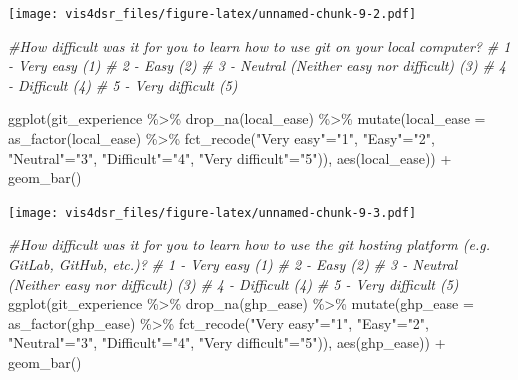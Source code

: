 \documentclass[
]{krantz}
\makeatletter
\newenvironment{Shaded}{\begin{snugshade}}{\end{snugshade}}
\newcommand{\AttributeTok}[1]{\textcolor[rgb]{0.61,0.61,0.61}{#1}}
\newcommand{\CommentTok}[1]{\textcolor[rgb]{0.37,0.37,0.37}{\textit{#1}}}
\newcommand{\FunctionTok}[1]{\textcolor[rgb]{0,0,0}{#1}}
\newcommand{\NormalTok}[1]{#1}
\newcommand{\OtherTok}[1]{\textcolor[rgb]{0.37,0.37,0.37}{#1}}
\newcommand{\SpecialCharTok}[1]{\textcolor[rgb]{0,0,0}{#1}}
\newcommand{\StringTok}[1]{\textcolor[rgb]{0.5,0.5,0.5}{#1}}
\newenvironment{kframe}{%
\medskip{}
\setlength{\fboxsep}{.8em}
 \def\at@end@of@kframe{}%
 \ifinner\ifhmode%
  \def\at@end@of@kframe{\end{minipage}}%
  \begin{minipage}{\columnwidth}%
 \fi\fi%
 \def\FrameCommand##1{\hskip\@totalleftmargin \hskip-\fboxsep
 \colorbox{shadecolor}{##1}\hskip-\fboxsep
     \hskip-\linewidth \hskip-\@totalleftmargin \hskip\columnwidth}%
 \MakeFramed {\advance\hsize-\width
   \@totalleftmargin\z@ \linewidth\hsize
   \@setminipage}}%
 {\par\unskip\endMakeFramed%
 \at@end@of@kframe}
\renewenvironment{Shaded}{\begin{kframe}}{\end{kframe}}
\makeatother
\begin{document}
\texttt{[image: vis4dsr\_files/figure-latex/unnamed-chunk-9-2.pdf]}

\begin{Shaded}
\begin{Highlighting}[]
\CommentTok{\#How difficult was it for you to learn how to use git on your local computer?}
\CommentTok{\# 1 {-} Very easy (1)}
\CommentTok{\# 2 {-} Easy (2)}
\CommentTok{\# 3 {-} Neutral (Neither easy nor difficult) (3)}
\CommentTok{\# 4 {-} Difficult (4)}
\CommentTok{\# 5 {-} Very difficult (5)}

\FunctionTok{ggplot}\NormalTok{(git\_experience }\SpecialCharTok{\%\textgreater{}\%} 
         \FunctionTok{drop\_na}\NormalTok{(local\_ease) }\SpecialCharTok{\%\textgreater{}\%}
         \FunctionTok{mutate}\NormalTok{(}\AttributeTok{local\_ease =} \FunctionTok{as\_factor}\NormalTok{(local\_ease) }\SpecialCharTok{\%\textgreater{}\%} 
             \FunctionTok{fct\_recode}\NormalTok{(}\StringTok{"Very easy"}\OtherTok{=}\StringTok{"1"}\NormalTok{, }
                        \StringTok{"Easy"}\OtherTok{=}\StringTok{"2"}\NormalTok{, }\StringTok{"Neutral"}\OtherTok{=}\StringTok{"3"}\NormalTok{, }
                        \StringTok{"Difficult"}\OtherTok{=}\StringTok{"4"}\NormalTok{, }\StringTok{"Very difficult"}\OtherTok{=}\StringTok{"5"}\NormalTok{)), }
       \FunctionTok{aes}\NormalTok{(local\_ease)) }\SpecialCharTok{+}
  \FunctionTok{geom\_bar}\NormalTok{()}
\end{Highlighting}
\end{Shaded}

\texttt{[image: vis4dsr\_files/figure-latex/unnamed-chunk-9-3.pdf]}

\begin{Shaded}
\begin{Highlighting}[]
\CommentTok{\#How difficult was it for you to learn how to use the git hosting platform (e.g. GitLab, GitHub, etc.)?}
\CommentTok{\# 1 {-} Very easy (1)}
\CommentTok{\# 2 {-} Easy (2)}
\CommentTok{\# 3 {-} Neutral (Neither easy nor difficult) (3)}
\CommentTok{\# 4 {-} Difficult (4)}
\CommentTok{\# 5 {-} Very difficult (5)}
\FunctionTok{ggplot}\NormalTok{(git\_experience }\SpecialCharTok{\%\textgreater{}\%} 
         \FunctionTok{drop\_na}\NormalTok{(ghp\_ease) }\SpecialCharTok{\%\textgreater{}\%}
         \FunctionTok{mutate}\NormalTok{(}\AttributeTok{ghp\_ease =} \FunctionTok{as\_factor}\NormalTok{(ghp\_ease) }\SpecialCharTok{\%\textgreater{}\%} 
             \FunctionTok{fct\_recode}\NormalTok{(}\StringTok{"Very easy"}\OtherTok{=}\StringTok{"1"}\NormalTok{, }
                        \StringTok{"Easy"}\OtherTok{=}\StringTok{"2"}\NormalTok{, }\StringTok{"Neutral"}\OtherTok{=}\StringTok{"3"}\NormalTok{, }
                        \StringTok{"Difficult"}\OtherTok{=}\StringTok{"4"}\NormalTok{, }\StringTok{"Very difficult"}\OtherTok{=}\StringTok{"5"}\NormalTok{)), }
       \FunctionTok{aes}\NormalTok{(ghp\_ease)) }\SpecialCharTok{+}
  \FunctionTok{geom\_bar}\NormalTok{()}
\end{Highlighting}
\end{Shaded}
\end{document}
